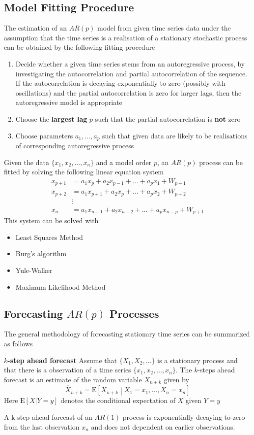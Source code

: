 \documentclass[11pt]{article}
\newcommand*\ev[1]{\mathrel{\text{E}\left[#1\right]}}
\begin{document}
\subsection{Model Fitting Procedure}
The estimation of an $AR(p)$ model from given time series data under the assumption that the time series is a realisation of a stationary stochastic process can be obtained by the following fitting procedure
\begin{enumerate}
	\item Decide whether a given time series stems from an autoregressive process, by investigating the autocorrelation and partial autocorrelation of the sequence. If the autocorrelation is decaying exponentially to zero (possibly with oscillations) and the partial autocorrelation is zero for larger lags, then the autoregressive model is appropriate
	\item Choose the \textbf{largest lag} $p$ such that the partial autocorrelation is \textbf{not} zero
	\item Choose parameters $a_1,\dots,a_p$ such that given data are likely to be realisations of corresponding autoregressive process
\end{enumerate}
Given the data $\{x_1,x_2,\dots,x_n\}$ and a model order $p$, an $AR(p)$ process can be fitted by solving the following linear equation system
\begin{align*}
	x_{p+1} &= a_1 x_p + a_2 x_{p-1} + \dots + a_p x_1 + W_{p+1}\\
	x_{p+2} &= a_1 x_{p+1} + a_2 x_{p} + \dots + a_p x_2 + W_{p+2}\\
	&\vdots \\
	x_n &= a_1 x_{n-1} + a_2 x_{n-2} + \dots + a_p x_{n-p} + W_{p+1}
\end{align*}
This system can be solved with
\begin{itemize}
	\item Least Squares Method
	\item Burg's algorithm
	\item Yule-Walker
	\item Maximum Likelihood Method
\end{itemize}

\subsection{Forecasting $AR(p)$ Processes}
The general methodology of forecasting stationary time series can be summarized as follows
\begin{definition}
	\textbf{$k$-step ahead forecast}
	Assume that $\{X_1,X_2,\dots\}$ is a stationary process and that there is a observation of a time series $\{x_1,x_2,\dots,x_n\}$. The $k$-steps ahead forecast is an estimate of the random variable $X_{n+k}$ given by
	\begin{equation*}
		\hat{X}_{n+k} = \ev{X_{n+k}\middle| X_1=x_1,\dots, X_n = x_n}
	\end{equation*}
	Here $\ev{X|Y=y}$ denotes the  conditional expectation of $X$ given $Y = y$
\end{definition}
A k-step ahead forecast of an $AR(1)$ process is exponentially decaying to zero from the last observation $x_n$ and does not dependent on earlier observations.
\end{document}
